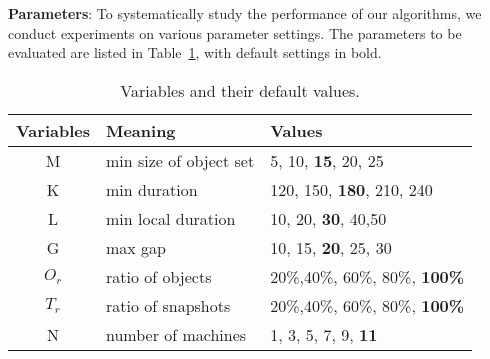 \textbf{Parameters}: To systematically study the performance of
our algorithms, we conduct experiments on various parameter settings. The parameters to be evaluated are listed in Table~\ref{tbl:parameters}, with default settings in bold. 
\begin{table}[h]
\small
\begin{tabular}{c|l|l}
\hline 
\textbf{Variables} & \textbf{Meaning} & \textbf{Values} \\ 
\hline 
M & min size of object set &  5, 10,  \textbf{15}, 20, 25 \\ 
\hline 
K & min duration & 120, 150, \textbf{180}, 210, 240 \\ 
\hline 
L & min local duration & 10, 20, \textbf{30}, 40,50 \\ 
\hline 
G & max gap & 10, 15, \textbf{20}, 25, 30 \\ 
\hline
$O_r$ & ratio of objects & 20\%,40\%, 60\%, 80\%, \textbf{100\%} \\ \hline
$T_r$ & ratio of snapshots & 20\%,40\%, 60\%, 80\%, \textbf{100\%} \\ \hline
N & number of machines & 1, 3, 5, 7, 9, \textbf{11}\\ 
\hline 
\end{tabular} 
\caption{Variables and their default values.}
\label{tbl:parameters}
\end{table}

